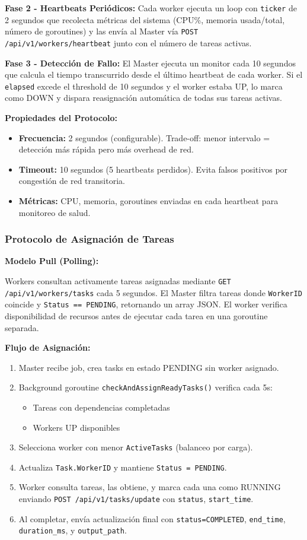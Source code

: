 \documentclass[conference]{IEEEtran}
\begin{document}
\textbf{Fase 2 - Heartbeats Periódicos:} Cada worker ejecuta un loop con \texttt{ticker} de 2 segundos que recolecta métricas del sistema (CPU\%, memoria usada/total, número de goroutines) y las envía al Master vía \texttt{POST /api/v1/workers/heartbeat} junto con el número de tareas activas.

\textbf{Fase 3 - Detección de Fallo:} El Master ejecuta un monitor cada 10 segundos que calcula el tiempo transcurrido desde el último heartbeat de cada worker. Si el \texttt{elapsed} excede el threshold de 10 segundos y el worker estaba UP, lo marca como DOWN y dispara reasignación automática de todas sus tareas activas.

\textbf{Propiedades del Protocolo:}
\begin{itemize}
\item \textbf{Frecuencia:} 2 segundos (configurable). Trade-off: menor intervalo = detección más rápida pero más overhead de red.
\item \textbf{Timeout:} 10 segundos (5 heartbeats perdidos). Evita falsos positivos por congestión de red transitoria.
\item \textbf{Métricas:} CPU, memoria, goroutines enviadas en cada heartbeat para monitoreo de salud.
\end{itemize}

\subsubsection{Protocolo de Asignación de Tareas}

\textbf{Modelo Pull (Polling):}

Workers consultan activamente tareas asignadas mediante \texttt{GET /api/v1/workers/tasks} cada 5 segundos. El Master filtra tareas donde \texttt{WorkerID} coincide y \texttt{Status == PENDING}, retornando un array JSON. El worker verifica disponibilidad de recursos antes de ejecutar cada tarea en una goroutine separada.

\textbf{Flujo de Asignación:}
\begin{enumerate}
\item Master recibe job, crea tasks en estado PENDING sin worker asignado.
\item Background goroutine \texttt{checkAndAssignReadyTasks()} verifica cada 5s:
   \begin{itemize}
   \item Tareas con dependencias completadas
   \item Workers UP disponibles
   \end{itemize}
\item Selecciona worker con menor \texttt{ActiveTasks} (balanceo por carga).
\item Actualiza \texttt{Task.WorkerID} y mantiene \texttt{Status = PENDING}.
\item Worker consulta tareas, las obtiene, y marca cada una como RUNNING enviando \texttt{POST /api/v1/tasks/update} con \texttt{status}, \texttt{start\_time}.
\item Al completar, envía actualización final con \texttt{status=COMPLETED}, \texttt{end\_time}, \texttt{duration\_ms}, y \texttt{output\_path}.
\end{enumerate}
\end{document}
